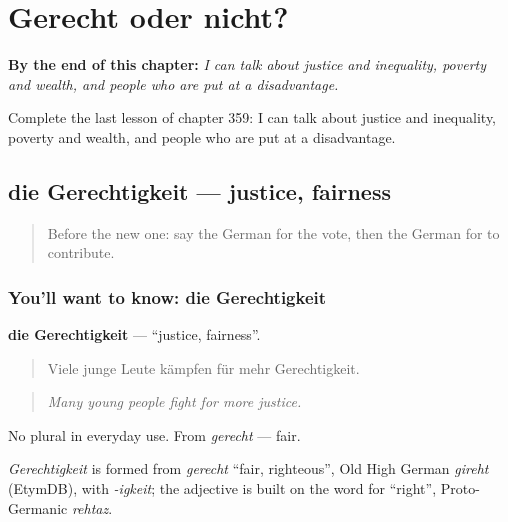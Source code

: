 
\chapter{Gerecht oder nicht?}
\label{ch:ge-gerecht-oder-nicht}

\begin{chapteropening}
\textbf{By the end of this chapter:} \emph{I can talk about justice and inequality, poverty and wealth, and people who are put at a disadvantage.}

Complete the last lesson of chapter 359: I can talk about justice and inequality, poverty and wealth, and people who are put at a disadvantage.
\end{chapteropening}

\section[die Gerechtigkeit]{die Gerechtigkeit — justice, fairness}

\label{lesson:GE-C359-gerechtigkeit}



\begin{quote}
Before the new one: say the German for the vote, then the German for to contribute.
\end{quote}

\subsection*{You'll want to know: die Gerechtigkeit}
\textbf{die Gerechtigkeit} — \textquotedblleft{}justice, fairness\textquotedblright{}.

\begin{quote}
Viele junge Leute kämpfen für mehr Gerechtigkeit.
\end{quote}

\begin{quote}
\emph{Many young people fight for more justice.}
\end{quote}

No plural in everyday use. From \emph{gerecht} — fair.

\begin{cousinweb}
\emph{Gerechtigkeit} is formed from \emph{gerecht} \textquotedblleft{}fair, righteous\textquotedblright{}, Old High German \emph{gireht} (EtymDB), with \emph{-igkeit}; the adjective is built on the word for \textquotedblleft{}right\textquotedblright{}, Proto-Germanic \emph{rehtaz}.
\end{cousinweb}


